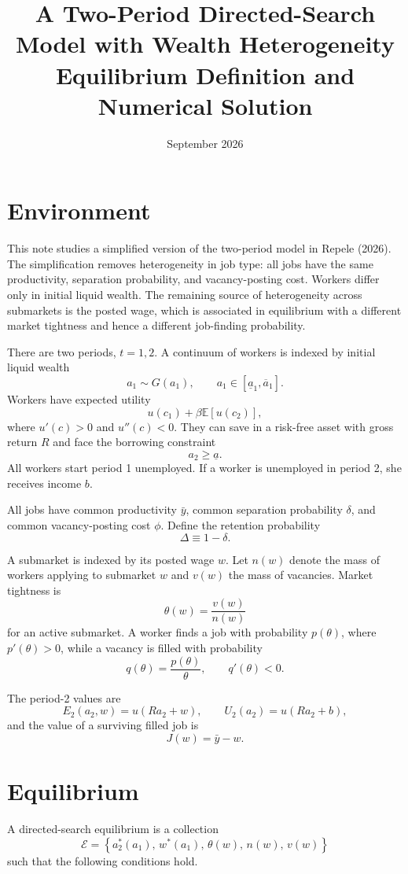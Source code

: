 \documentclass[11pt]{article}
\title{A Two-Period Directed-Search Model with Wealth Heterogeneity\\
\large Equilibrium Definition and Numerical Solution}
\author{}
\date{September 2026}
\newcommand{\E}{\mathbb{E}}
\newcommand{\1}{\mathbf{1}}
\begin{document}
\maketitle

\section{Environment}

This note studies a simplified version of the two-period model in Repele (2026). The simplification removes heterogeneity in job type: all jobs have the same productivity, separation probability, and vacancy-posting cost. Workers differ only in initial liquid wealth. The remaining source of heterogeneity across submarkets is the posted wage, which is associated in equilibrium with a different market tightness and hence a different job-finding probability.

There are two periods, $t=1,2$. A continuum of workers is indexed by initial liquid wealth
\[
a_1 \sim G(a_1), \qquad a_1 \in [\underline a_1,\overline a_1].
\]
Workers have expected utility
\[
u(c_1)+\beta\E[u(c_2)],
\]
where $u'(c)>0$ and $u''(c)<0$. They can save in a risk-free asset with gross return $R$ and face the borrowing constraint
\[
a_2\geq \underline a.
\]
All workers start period 1 unemployed. If a worker is unemployed in period 2, she receives income $b$.

All jobs have common productivity $\bar y$, common separation probability $\delta$, and common vacancy-posting cost $\phi$. Define the retention probability
\[
\Delta \equiv 1-\delta.
\]

A submarket is indexed by its posted wage $w$. Let $n(w)$ denote the mass of workers applying to submarket $w$ and $v(w)$ the mass of vacancies. Market tightness is
\[
\theta(w)=\frac{v(w)}{n(w)}
\]
for an active submarket. A worker finds a job with probability $p(\theta)$, where $p'(\theta)>0$, while a vacancy is filled with probability
\[
q(\theta)=\frac{p(\theta)}{\theta}, \qquad q'(\theta)<0.
\]

The period-2 values are
\[
E_2(a_2,w)=u(Ra_2+w), \qquad U_2(a_2)=u(Ra_2+b),
\]
and the value of a surviving filled job is
\[
J(w)=\bar y-w.
\]

\section{Equilibrium}

A directed-search equilibrium is a collection
\[
\mathcal E=\left\{a_2^*(a_1),\,w^*(a_1),\,\theta(w),\,n(w),\,v(w)\right\}
\]
such that the following conditions hold.
\end{document}

